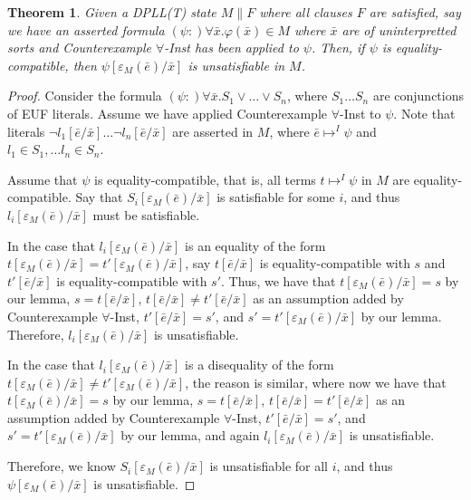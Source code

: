 \documentclass{llncs}
\newtheorem{thm}{Theorem}
\begin{document}
\begin{thm}
Given a DPLL(T) state $M \parallel F$ where all clauses $F$ are satisfied, say we have an asserted formula $(\psi :) \forall \bar{x}. \varphi(\bar{x} ) \in M$ where $\bar{x}$ are of uninterpretted sorts and Counterexample $\forall$-Inst has been applied to $\psi$.
Then, if $\psi$ is equality-compatible, then $\psi[\varepsilon_M( \bar{e} )/\bar{x}]$ is unsatisfiable in $M$. \\
\end{thm}
\begin{proof}
Consider the formula $(\psi :) \forall \bar{x}. S_1 \vee \ldots \vee S_n$, where $S_1 \ldots S_n$ are conjunctions of EUF literals.
Assume we have applied Counterexample $\forall$-Inst to $\psi$.
Note that literals $\neg l_1 [\bar{e}/\bar{x}] \ldots \neg l_n [ \bar{e}/\bar{x} ]$ are asserted in $M$, where $\bar{e} \mapsto^I \psi$ and $l_1 \in S_1, \ldots l_n \in S_n$.

Assume that $\psi$ is equality-compatible, that is, all terms $t \mapsto^I \psi$ in $M$ are equality-compatible.
Say that $S_i[\varepsilon_M(\bar{e})/\bar{x}]$ is satisfiable for some $i$, and thus $l_i[\varepsilon_M(\bar{e})/\bar{x}]$ must be satisfiable.

In the case that $l_i[\varepsilon_M(\bar{e})/\bar{x}]$ is an equality of the form $t[\varepsilon_M(\bar{e})/\bar{x}] = t'[\varepsilon_M(\bar{e})/\bar{x}]$, say $t[\bar{e}/\bar{x}]$ is equality-compatible with $s$ and $t'[\bar{e}/\bar{x}]$ is equality-compatible with $s'$.
Thus, we have that $t[\varepsilon_M(\bar{e})/\bar{x}] = s$ by our lemma, $s = t[\bar{e}/\bar{x}]$, $t[\bar{e}/\bar{x}] \neq t'[\bar{e}/\bar{x}]$ as an assumption added by Counterexample $\forall$-Inst, $t'[\bar{e}/\bar{x}] = s'$, and $s' = t'[\varepsilon_M(\bar{e})/\bar{x}]$ by our lemma.
Therefore, $l_i[\varepsilon_M(\bar{e})/\bar{x}]$ is unsatisfiable.

In the case that $l_i[\varepsilon_M(\bar{e})/\bar{x}]$ is a disequality of the form $t[\varepsilon_M(\bar{e})/\bar{x}] \neq t'[\varepsilon_M(\bar{e})/\bar{x}]$, the reason is similar, where now we have that $t[\varepsilon_M(\bar{e})/\bar{x}] = s$ by our lemma, $s = t[\bar{e}/\bar{x}]$, $t[\bar{e}/\bar{x}] = t'[\bar{e}/\bar{x}]$ as an assumption added by Counterexample $\forall$-Inst, $t'[\bar{e}/\bar{x}] = s'$, and $s' = t'[\varepsilon_M(\bar{e})/\bar{x}]$ by our lemma, and again $l_i[\varepsilon_M(\bar{e})/\bar{x}]$ is unsatisfiable.

Therefore, we know $S_i[\varepsilon_M(\bar{e})/\bar{x}]$ is unsatisfiable for all $i$, and thus $\psi[\varepsilon_M(\bar{e})/\bar{x}]$ is unsatisfiable.
\end{proof}
\end{document}
